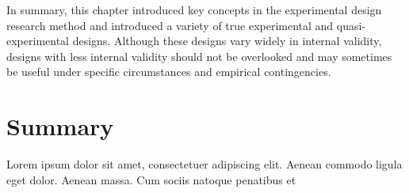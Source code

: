 In summary, this chapter introduced key concepts in the experimental design research method and introduced a variety of true experimental and quasi-experimental designs. Although these designs vary widely in internal validity, designs with less internal validity should not be overlooked and may sometimes be useful under specific circumstances and empirical contingencies.





\section{Summary}\label{ch10:summary}

Lorem ipsum dolor sit amet, consectetuer adipiscing elit. Aenean commodo ligula eget dolor. Aenean massa. Cum sociis natoque penatibus et
